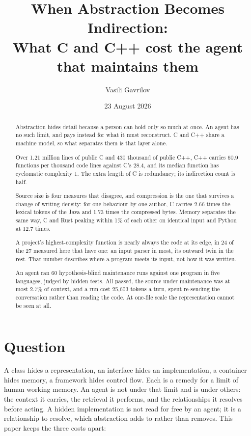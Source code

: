 \documentclass[11pt,a4paper]{article}
\title{When Abstraction Becomes Indirection:\\
\large What C and C++ cost the agent that maintains them}
\author{Vasili Gavrilov}
\date{23 August 2026}
\begin{document}
\maketitle

\begin{abstract}
Abstraction hides detail because a person can hold only so much at once. An agent has no such limit, and pays instead for what it must reconstruct. C and C++ share a machine model, so what separates them is that layer alone.

Over 1.21 million lines of public C and 430 thousand of public C++, C++ carries 60.9 functions per thousand code lines against C's 28.4, and its median function has cyclomatic complexity 1. The extra length of C is redundancy; its indirection count is half.

Source size is four measures that disagree, and compression is the one that survives a change of writing density: for one behaviour by one author, C carries 2.66 times the lexical tokens of the Java and 1.73 times the compressed bytes. Memory separates the same way, C and Rust peaking within 1\% of each other on identical input and Python at 12.7 times.

A project's highest-complexity function is nearly always the code at its edge, in 24 of the 27 measured here that have one: an input parser in most, its outward twin in the rest. That number describes where a program meets its input, not how it was written.

An agent ran 60 hypothesis-blind maintenance runs against one program in five languages, judged by hidden tests. All passed, the source under maintenance was at most 2.7\% of context, and a run cost 25,603 tokens a turn, spent re-sending the conversation rather than reading the code. At one-file scale the representation cannot be seen at all.
\end{abstract}

\section{Question}

A class hides a representation, an interface hides an implementation, a container hides memory, a framework hides control flow. Each is a remedy for a limit of human working memory. An agent is not under that limit and is under others: the context it carries, the retrieval it performs, and the relationships it resolves before acting. A hidden implementation is not read for free by an agent; it is a relationship to resolve, which abstraction adds to rather than removes. This paper keeps the three costs apart:
\end{document}
